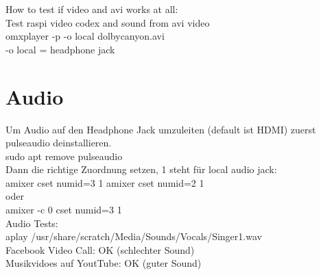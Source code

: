 How to test if video and avi works at all:\\
Test raspi video codex and sound from avi video\\
omxplayer -p -o local dolbycanyon.avi\\
-o local = headphone jack

\section{Audio}
Um Audio auf den Headphone Jack umzuleiten (default ist HDMI) zuerst pulseaudio deinstallieren.\\
sudo apt remove pulseaudio\\

Dann die richtige Zuordnung setzen, 1 steht für local audio jack:\\
amixer cset numid=3 1
amixer cset numid=2 1\\
oder \\
amixer -c 0 cset numid=3 1\\

Audio Tests:\\
aplay /usr/share/scratch/Media/Sounds/Vocals/Singer1.wav\\
Facebook Video Call: OK (schlechter Sound)\\
Musikvidoes auf YoutTube: OK (guter Sound)\\
